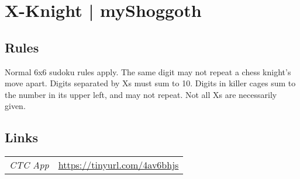 \section[X-Knight | myShoggoth {[\emph{Sudoku, Killer, XV}]}]{X-Knight | {\normalfont myShoggoth}}
\label{sec:01-x-knight-myshoggoth}

\subsection*{Rules}
\begin{markdown}
Normal 6x6 sudoku rules apply. The same digit may not repeat a chess knight's move apart. Digits separated by Xs must sum to 10. Digits in killer cages sum to the number in its upper left, and may not repeat. Not all Xs are necessarily given.
\end{markdown}
\subsection*{Links}
\begin{tabularx}{\textwidth}{l X}
\emph{CTC App} & \url{https://tinyurl.com/4av6bhjs} \\
\end{tabularx}
\pagebreak
